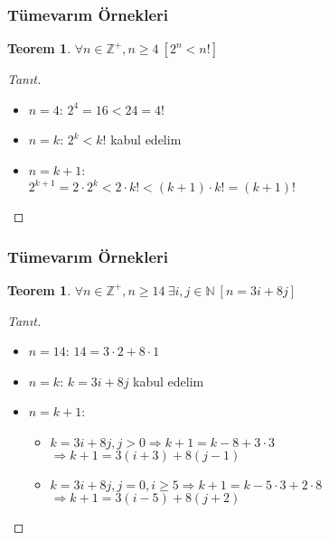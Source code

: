 \documentclass[dvipsnames]{beamer}
\theoremstyle{definition}
\theoremstyle{example}
\theoremstyle{plain}
\newtheorem{teorem}[theorem]{Teorem}
\begin{document}
\begin{frame}
  \frametitle{Tümevarım Örnekleri}

  \begin{teorem}
    $\forall n \in \mathbb{Z}^+, n \geq 4~[2^n < n!]$
  \end{teorem}

  \pause
  \begin{proof}[Tanıt]
    \begin{itemize}
      \item $n=4$: $2^4=16<24=4!$

      \pause
      \item $n=k$: $2^k < k!$ kabul edelim

      \pause
      \item $n=k+1$:\\
        $2^{k+1} = 2 \cdot 2^k < 2 \cdot k! < (k+1) \cdot k! = (k+1)!$
    \end{itemize}
  \end{proof}
\end{frame}

\begin{frame}
  \frametitle{Tümevarım Örnekleri}

  \begin{teorem}
    $\forall n \in \mathbb{Z}^+, n \geq 14~\exists i,j \in \mathbb{N}~[n=3i+8j]$
  \end{teorem}

  \pause
  \begin{proof}[Tanıt]
    \begin{itemize}
      \item $n=14$: $14=3 \cdot 2 + 8 \cdot 1$

      \pause
      \item $n=k$: $k=3i+8j$ kabul edelim

      \pause
      \item $n=k+1$:
      \begin{itemize}
        \item $k=3i+8j, j>0 \Rightarrow k+1=k-8+3 \cdot 3$\\
          $\Rightarrow k+1=3(i+3)+8(j-1)$
        \item $k=3i+8j, j=0, i \geq 5 \Rightarrow k+1=k-5 \cdot 3+2 \cdot 8$\\
          $\Rightarrow k+1=3(i-5)+8(j+2)$
      \end{itemize}
    \end{itemize}
  \end{proof}
\end{frame}
\end{document}
